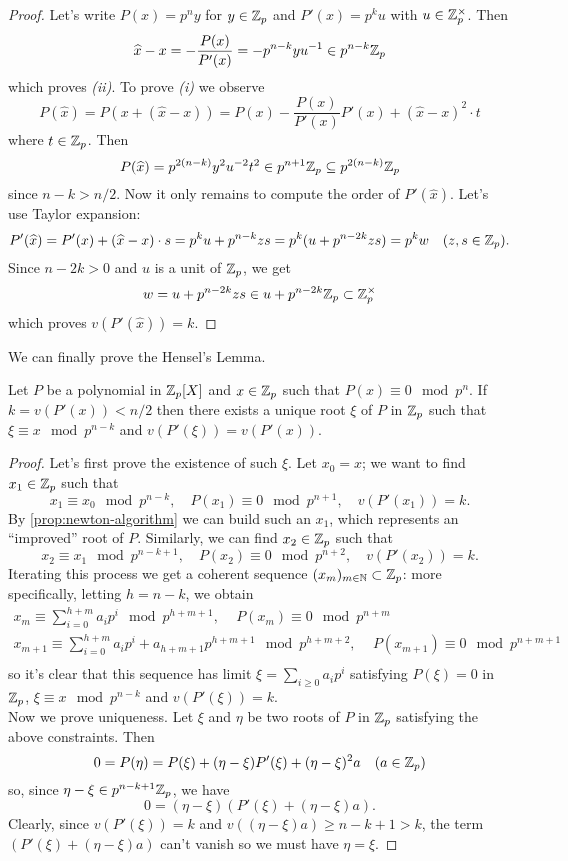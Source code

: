 		\begin{proof}
			Let's write $P(x) = p^ny$ for $y \in \mathbb{Z}_p$ and $P'(x) = p^ku$ with $u \in \mathbb{Z}_p^\times$. Then 
			\[
				\widehat{x} - x = -\frac{P(x)}{P'(x)} = - p^{n-k}yu^{-1} \in p^{n-k}\mathbb{Z}_p
			\]
			which proves \textit{(ii)}. To prove \textit{(i)} we observe
			\[
				P(\widehat{x}) = P(x + (\widehat{x} - x)) = P(x) -\frac{P(x)}{P'(x)} P'(x) + (\widehat{x} - x)^2 \cdot t 
			\]
			where $t \in \mathbb{Z}_p$. Then
			\[
				P(\widehat{x}) = p^{2(n-k)}y^2u^{-2}t^2 \in p^{n+1}\mathbb{Z}_p \subseteq p^{2(n -k)}\mathbb{Z}_p
			\]
			since $n - k > n/2$. Now it only remains to compute the order of $P'(\widehat{x})$. Let's use Taylor expansion:
			\[
				P'(\widehat{x}) = P'(x) + (\widehat{x} - x)\cdot s = p^ku + p^{n-k}zs = p^k(u + p^{n-2k}zs) = p^kw \quad (z, s \in \mathbb{Z}_p).
			\]
			Since $n - 2k > 0$ and $u$ is a unit of $\mathbb{Z}_p$, we get
			\[
				w = u + p^{n-2k}zs \in u + p^{n-2k}\mathbb{Z}_p \subset \mathbb{Z}_p^\times
			\]
			which proves $v(P'(\widehat{x})) = k$.
		\end{proof}
		We can finally prove the Hensel's Lemma.
		\begin{thm}
			\label{thm:hensel-lemma}
			Let $P$ be a polynomial in $\mathbb{Z}_p[X]$ and $x \in \mathbb{Z}_p$ such that $P(x) \equiv 0 \mod p^n$. If $k = v(P'(x)) < n/2$ then there exists a unique root $\xi$ of $P$ in $\mathbb{Z}_p$ such that $\xi \equiv x \mod p^{n-k}$ and $v(P'(\xi)) = v(P'(x))$.
		\end{thm}
		\begin{proof}
			Let's first prove the existence of such $\xi$. Let $x_0 = x$; we want to find $x_1 \in \mathbb{Z}_p$ such that
			\[
				x_1 \equiv x_0 \mod p^{n-k}, \quad  P(x_1) \equiv 0 \mod p^{n+1}, \quad v(P'(x_1)) = k.
			\]
			By \cref{prop:newton-algorithm} we can build such an $x_1$, which represents an ``improved'' root of $P$. Similarly, we can find $x_2 \in \mathbb{Z}_p$ such that
			\[
				x_2 \equiv x_1 \mod p^{n-k+1}, \quad P(x_2) \equiv 0 \mod p^{n+2}, \quad v(P'(x_2)) = k.
			\]
			Iterating this process we get a coherent sequence $(x_m)_{m\in \mathbb{N}} \subset \mathbb{Z}_p$: more specifically, letting $h = n-k$, we obtain
			\begin{gather*}
				x_m \equiv \sum_{i=0}^{h+m} a_ip^i \mod p^{h+m+1} \text{, } \quad  P(x_m) \equiv 0 \mod p^{n+m} \\
				x_{m+1} \equiv \sum_{i=0}^{h+m} a_ip^i + a_{h+m+1}p^{h+m+1} \mod p^{h+m+2} \text{, } \quad P(x_{m+1}) \equiv 0 \mod p^{n+m+1} \\
			\end{gather*}
			so it's clear that this sequence has \padic limit $\xi = \sum_{i \geq 0} a_ip^i$ satisfying $P(\xi) = 0$ in $\mathbb{Z}_p$, $\xi \equiv x \mod p^{n-k}$ and $v(P'(\xi)) = k$. \\
			Now we prove uniqueness. Let $\xi$ and $\eta$ be two roots of $P$ in $\mathbb{Z}_p$ satisfying the above constraints. Then
			\[
				0 = P(\eta) = P(\xi) + (\eta - \xi)P'(\xi) + (\eta - \xi)^2a \quad (a \in \mathbb{Z}_p)
			\]
			so, since $\eta - \xi \in p^{n-k+1}\mathbb{Z}_p$, we have
			\[
				0 = (\eta - \xi)(P'(\xi) + (\eta - \xi)a).
			\]
			Clearly, since $v(P'(\xi)) = k$ and $v((\eta - \xi)a) \geq n-k+1 > k$, the term $(P'(\xi) + (\eta - \xi)a)$ can't vanish so we must have $\eta = \xi$.
		\end{proof}
